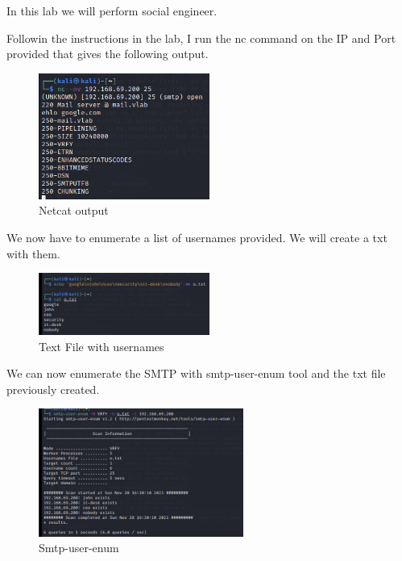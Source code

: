 
In this lab we will perform social engineer.

Followin the instructions in the lab, I run the nc command on the IP and Port provided
that gives the following output.

\begin{figure}[H]
  \centering
  \includegraphics[width=0.5\textwidth]{figures/nc}
  \caption{Netcat output}
  \label{f:nc}
\end{figure}

We now have to enumerate a list of usernames provided. We will create a txt with
them.

\begin{figure}[H]
  \centering
  \includegraphics[width=0.5\textwidth]{figures/o}
  \caption{Text File with usernames}
  \label{f:o}
\end{figure}

We can now enumerate the SMTP with smtp-user-enum tool and the txt file
previously created.

\begin{figure}[H]
  \centering
  \includegraphics[width=0.6\textwidth]{figures/smtp-user-enum}
  \caption{Smtp-user-enum}
  \label{f:smtp-user-enum}
\end{figure}


